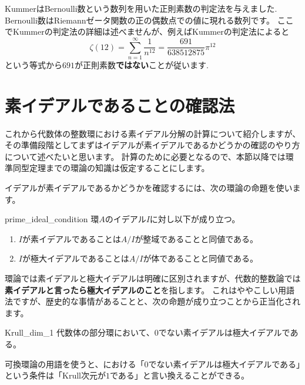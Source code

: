 \documentclass[11pt,b5paper,oneside,titlepage,lualatex]{ltjsreport}
\begin{document}
KummerはBernoulli数という数列を用いた正則素数の判定法を与えました. 
Bernoulli数はRiemannゼータ関数の正の偶数点での値に現れる数列です。
ここでKummerの判定法の詳細は述べませんが、例えばKummerの判定法によると
\[
\zeta(12) = \sum_{n=1}^{\infty} \frac{1}{n^{12}} = \frac{691}{638512875} \pi^{12}
\]
という等式から$ 691 $が正則素数\textbf{ではない}ことが従います. 


\section{素イデアルであることの確認法} \label{sec:素イデアルであることの確認法}


これから代数体の整数環における素イデアル分解の計算について紹介しますが、その準備段階としてまずはイデアルが素イデアルであるかどうかの確認のやり方について述べたいと思います。
計算のために必要となるので、本節以降では環準同型定理までの環論の知識は仮定することにします。

イデアルが素イデアルであるかどうかを確認するには、次の環論の命題を使います。

\begin{prop}{}{prime_ideal_condition}
	環$ A $のイデアル$ I $に対し以下が成り立つ。
	\begin{enumerate}
		\item $ I $が素イデアルであることは$ A/I $が整域であることと同値である。
		\item $ I $が極大イデアルであることは$ A/I $が体であることと同値である。
	\end{enumerate}
\end{prop}

環論では素イデアルと極大イデアルは明確に区別されますが、代数的整数論では\textbf{素イデアルと言ったら極大イデアルのこと}を指します。
これはややこしい用語法ですが、歴史的な事情があることと、次の命題が成り立つことから正当化されます。

\begin{prop}{}{Krull_dim_1}
	代数体の部分環において、$ 0 $でない素イデアルは極大イデアルである。
\end{prop}

\begin{rem}{}{}
	可換環論の用語を使うと、における「$ 0 $でない素イデアルは極大イデアルである」という条件は「Krull次元が$ 1 $である」と言い換えることができる。
\end{rem}
\end{document}
